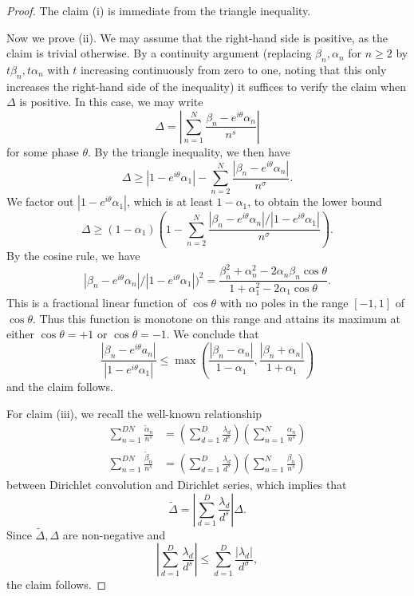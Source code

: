 \begin{proof}  The claim (i) is immediate from the triangle inequality.

Now we prove (ii).  We may assume that the right-hand side is positive, as the claim is trivial otherwise.  By a continuity argument (replacing $\beta_n,\alpha_n$ for $n \geq 2$ by $t \beta_n, t \alpha_n$ with $t$ increasing continuously from zero to one, noting that this only increases the right-hand side of the inequality) it suffices to verify the claim when $\Delta$ is positive.  In this case, we may write
$$ \Delta = |\sum_{n=1}^N \frac{\beta_n - e^{i\theta} \alpha_n}{n^s}|$$
for some phase $\theta$.   By the triangle inequality, we then have
$$ \Delta \geq |1 - e^{i\theta} \alpha_1| - \sum_{n=2}^N \frac{|\beta_n - e^{i\theta} \alpha_n|}{n^\sigma}.$$
We factor out $|1 - e^{i\theta} \alpha_1|$, which is at least $1-\alpha_1$, to obtain the lower bound
$$ \Delta \geq  (1-\alpha_1) \left(1 - \sum_{n=2}^N \frac{|\beta_n - e^{i\theta} \alpha_n| / |1 - e^{i\theta} \alpha_1|}{n^\sigma}\right).$$
By the cosine rule, we have
$$ |\beta_n - e^{i\theta} \alpha_n| / |1 - e^{i\theta} \alpha_1|)^2 = \frac{\beta_n^2 + \alpha_n^2 - 2 \alpha_n \beta_n \cos \theta}{1 + \alpha_1^2 -2 \alpha_1 \cos \theta}.$$
This is a fractional linear function of $\cos \theta$ with no poles in the range $[-1,1]$ of $\cos \theta$.  Thus this function is monotone on this range and attains its maximum at either $\cos \theta=+1$ or $\cos \theta = -1$.  We conclude that
$$ \frac{|\beta_n - e^{i\theta} a_n|}{|1 - e^{i\theta} \alpha_1|} \leq \max( \frac{|\beta_n-\alpha_n|}{1-\alpha_1}, \frac{|\beta_n+\alpha_n|}{1+\alpha_1} )$$
and the claim follows.

For claim (iii), we recall the well-known relationship 
\begin{align*}
\sum_{n=1}^{DN} \frac{\tilde \alpha_n}{n^s} &= \left(\sum_{d=1}^{D} \frac{\lambda_d}{d^s}\right) \left(\sum_{n=1}^{N} \frac{\alpha_n}{n^s}\right)\\
\sum_{n=1}^{DN} \frac{\tilde \beta_n}{n^s} &= \left(\sum_{d=1}^{D} \frac{\lambda_d}{d^s}\right) \left(\sum_{n=1}^{N} \frac{\beta_n}{n^s}\right)
\end{align*}
between Dirichlet convolution and Dirichlet series, which implies that
$$ \tilde \Delta = \left|\sum_{d=1}^{D} \frac{\lambda_d}{d^s}\right| \Delta.$$
Since $\tilde \Delta,\Delta$ are non-negative and 
$$ \left|\sum_{d=1}^{D} \frac{\lambda_d}{d^s}\right| \leq \sum_{d=1}^D \frac{|\lambda_d|}{d^\sigma},$$
the claim follows.
\end{proof}

